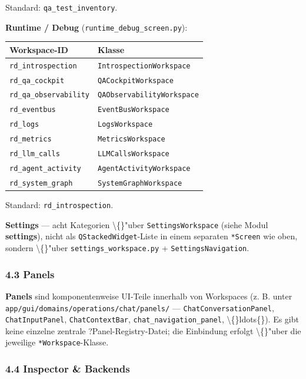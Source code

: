 Standard: \texttt{qa\_test\_inventory}.

\textbf{Runtime / Debug} (\texttt{runtime\_debug\_screen.py}):

\begin{center}
\begin{tabular}{ll}
\hline
Workspace-ID & Klasse \\
\hline
\texttt{rd\_introspection} & \texttt{IntrospectionWorkspace} \\
\texttt{rd\_qa\_cockpit} & \texttt{QACockpitWorkspace} \\
\texttt{rd\_qa\_observability} & \texttt{QAObservabilityWorkspace} \\
\texttt{rd\_eventbus} & \texttt{EventBusWorkspace} \\
\texttt{rd\_logs} & \texttt{LogsWorkspace} \\
\texttt{rd\_metrics} & \texttt{MetricsWorkspace} \\
\texttt{rd\_llm\_calls} & \texttt{LLMCallsWorkspace} \\
\texttt{rd\_agent\_activity} & \texttt{AgentActivityWorkspace} \\
\texttt{rd\_system\_graph} & \texttt{SystemGraphWorkspace} \\
\hline
\end{tabular}
\end{center}

Standard: \texttt{rd\_introspection}.

\textbf{Settings} --- acht Kategorien \textbackslash\{\}"uber \texttt{SettingsWorkspace} (siehe Modul \textbf{settings}), nicht als \texttt{QStackedWidget}-Liste in einem separaten \texttt{*Screen} wie oben, sondern \textbackslash\{\}"uber \texttt{settings\_workspace.py} + \texttt{SettingsNavigation}.

\subsubsection{4.3 Panels}

\textbf{Panels} sind komponentenweise UI-Teile innerhalb von Workspaces (z. B. unter \texttt{app/gui/domains/operations/chat/panels/} --- \texttt{ChatConversationPanel}, \texttt{ChatInputPanel}, \texttt{ChatContextBar}, \texttt{chat\_navigation\_panel}, \textbackslash\{\}ldots\{\}). Es gibt keine einzelne zentrale ?Panel-Registry\texttt{}-Datei; die Einbindung erfolgt \textbackslash\{\}"uber die jeweilige \texttt{*Workspace}-Klasse.

\subsubsection{4.4 Inspector \& Backends}

